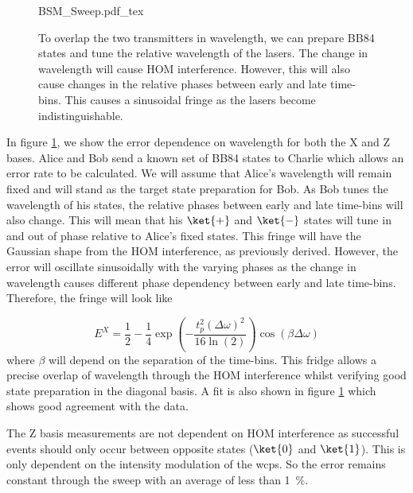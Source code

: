 \begin{figure}[t]
	\centering
	\small
	\def\svgwidth{0.9\textwidth} 
	{BSM_Sweep.pdf_tex}
	\caption[Bell-state projection error against laser current]{To overlap the two transmitters in wavelength, we can prepare BB84 states and tune the relative wavelength of the lasers. The change in wavelength will cause \ac{HOM} interference. However, this will also cause changes in the relative phases between early and late time-bins. This causes a sinusoidal fringe as the lasers become indistinguishable.}
	\label{fig:wavelength_cal}
\end{figure}

In figure \ref{fig:wavelength_cal}, we show the error dependence on wavelength for both the X and Z bases. Alice and Bob send a known set of BB84 states to Charlie which allows an error rate to be calculated. We will assume that Alice's wavelength will remain fixed and will stand as the target state preparation for Bob. As Bob tunes the wavelength of his states, the relative phases between early and late time-bins will also change. This will mean that his $\ket{+}$ and $\ket{-}$ states will tune in and out of phase relative to Alice's fixed states. This fringe will have the Gaussian shape from the \ac{HOM} interference, as previously derived. However, the error will oscillate sinusoidally with the varying phases as the change in wavelength causes different phase dependency between early and late time-bins. Therefore, the fringe will look like

\begin{equation}
	E^X = \frac{1}{2} - \frac{1}{4} \exp\left(-\frac{t_p^2(\Delta\omega)^2}{16\ln(2)}\right) \cos(\beta\Delta\omega)
\end{equation}
where $\beta$ will depend on the separation of the time-bins. This fridge allows a precise overlap of wavelength through the \ac{HOM} interference whilst verifying good state preparation in the diagonal basis. A fit is also shown in figure \ref{fig:wavelength_cal} which shows good agreement with the data. 

The Z basis measurements are not dependent on \ac{HOM} interference as successful events should only occur between opposite states ($\ket{0}$ and $\ket{1}$). This is only dependent on the intensity modulation of the \acp{wcp}. So the error remains constant through the sweep with an average of less than \SI{1}{\percent}.

%

